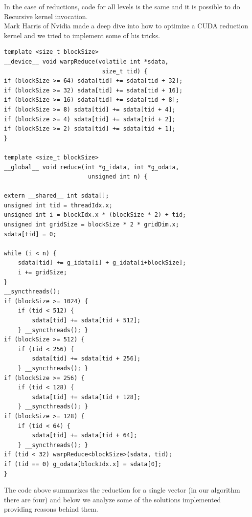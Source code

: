 \documentclass[10pt,twocolumn,letterpaper]{article}
\begin{document}
In the case of reductions, code for all levels is the same and it is possible to do Recursive kernel invocation.\\
Mark Harris of Nvidia made a deep dive into how to optimize a CUDA reduction kernel and we tried to implement some of his tricks.

\begin{lstlisting}
template <size_t blockSize> 
__device__ void warpReduce(volatile int *sdata,
                            size_t tid) { 
if (blockSize >= 64) sdata[tid] += sdata[tid + 32]; 
if (blockSize >= 32) sdata[tid] += sdata[tid + 16]; 
if (blockSize >= 16) sdata[tid] += sdata[tid + 8]; 
if (blockSize >= 8) sdata[tid] += sdata[tid + 4]; 
if (blockSize >= 4) sdata[tid] += sdata[tid + 2]; 
if (blockSize >= 2) sdata[tid] += sdata[tid + 1]; 
}

template <size_t blockSize> 
__global__ void reduce(int *g_idata, int *g_odata, 
                        unsigned int n) {
                        
extern __shared__ int sdata[]; 
unsigned int tid = threadIdx.x; 
unsigned int i = blockIdx.x * (blockSize * 2) + tid; 
unsigned int gridSize = blockSize * 2 * gridDim.x; 
sdata[tid] = 0; 

while (i < n) { 
    sdata[tid] += g_idata[i] + g_idata[i+blockSize]; 
    i += gridSize; 
} 
__syncthreads(); 
if (blockSize >= 1024) {
    if (tid < 512) { 
        sdata[tid] += sdata[tid + 512];
    } __syncthreads(); } 
if (blockSize >= 512) { 
    if (tid < 256) { 
        sdata[tid] += sdata[tid + 256];
    } __syncthreads(); } 
if (blockSize >= 256) { 
    if (tid < 128) { 
        sdata[tid] += sdata[tid + 128];
    } __syncthreads(); } 
if (blockSize >= 128) {
    if (tid < 64) { 
        sdata[tid] += sdata[tid + 64]; 
    } __syncthreads(); } 
if (tid < 32) warpReduce<blockSize>(sdata, tid); 
if (tid == 0) g_odata[blockIdx.x] = sdata[0];
} 

\end{lstlisting}

The code above summarizes the reduction for a single vector (in our algorithm there are four) and below we analyze some of the solutions implemented providing reasons behind them.
\end{document}
